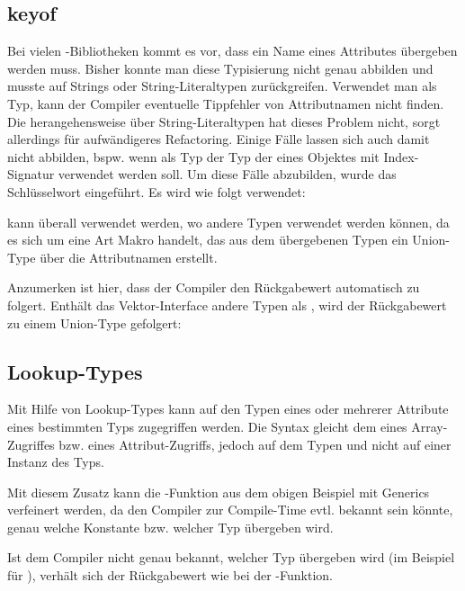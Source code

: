 \subsection{keyof}
Bei vielen \js-Bibliotheken kommt es vor, dass ein Name eines Attributes übergeben werden muss. Bisher konnte man diese Typisierung nicht genau abbilden und musste auf Strings oder String-Literaltypen zurückgreifen. Verwendet man \tsstring als Typ, kann der Compiler eventuelle Tippfehler von Attributnamen nicht finden. Die herangehensweise über String-Literaltypen hat dieses Problem nicht, sorgt allerdings für aufwändigeres Refactoring. Einige Fälle lassen sich auch damit nicht abbilden, bspw. wenn als Typ der Typ der eines Objektes mit Index-Signatur verwendet werden soll.
Um diese Fälle abzubilden, wurde das Schlüsselwort \tskeyof eingeführt. Es wird wie folgt verwendet:


\tskeyof kann überall verwendet werden, wo andere Typen verwendet werden können, da es sich um eine Art Makro handelt, das aus dem übergebenen Typen ein Union-Type über die Attributnamen erstellt.


Anzumerken ist hier, dass der Compiler den Rückgabewert automatisch zu \tsnumber folgert. Enthält das Vektor-Interface andere Typen als \tsnumber, wird der Rückgabewert zu einem Union-Type gefolgert:


\subsection{Lookup-Types}
Mit Hilfe von Lookup-Types kann auf den Typen eines oder mehrerer Attribute eines bestimmten Typs zugegriffen werden. Die Syntax gleicht dem eines Array-Zugriffes bzw. eines Attribut-Zugriffs, jedoch auf dem Typen und nicht auf einer Instanz des Typs.


Mit diesem Zusatz kann die -Funktion aus dem obigen Beispiel mit Generics verfeinert werden, da den Compiler zur Compile-Time evtl. bekannt sein könnte, genau welche Konstante bzw. welcher Typ übergeben wird.


Ist dem Compiler nicht genau bekannt, welcher Typ übergeben wird (im Beispiel für ), verhält sich der Rückgabewert wie bei der -Funktion.

